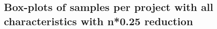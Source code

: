 \begin{appendices}
\section{Box-plots of samples per project with all characteristics with n*0.25 reduction}
\label{ap:full_25}
\begin{figure}[h]
    \centering
    \qquad
\end{figure}


\end{appendices}
